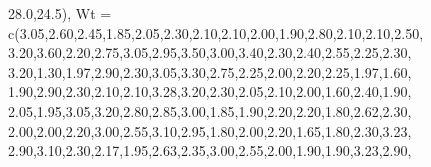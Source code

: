 \documentclass[
  letterpaper,
  DIV=11,
  numbers=noendperiod]{scrartcl}
\newenvironment{Shaded}{\begin{snugshade}}{\end{snugshade}}
\newcommand{\AttributeTok}[1]{\textcolor[rgb]{0.40,0.45,0.13}{#1}}
\newcommand{\FloatTok}[1]{\textcolor[rgb]{0.68,0.00,0.00}{#1}}
\newcommand{\FunctionTok}[1]{\textcolor[rgb]{0.28,0.35,0.67}{#1}}
\newcommand{\NormalTok}[1]{\textcolor[rgb]{0.00,0.23,0.31}{#1}}
\begin{document}
\begin{Shaded}
\begin{Highlighting}[]
        \FloatTok{28.0}\NormalTok{,}\FloatTok{24.5}\NormalTok{),}
  \AttributeTok{Wt =} \FunctionTok{c}\NormalTok{(}\FloatTok{3.05}\NormalTok{,}\FloatTok{2.60}\NormalTok{,}\FloatTok{2.45}\NormalTok{,}\FloatTok{1.85}\NormalTok{,}\FloatTok{2.05}\NormalTok{,}\FloatTok{2.30}\NormalTok{,}\FloatTok{2.10}\NormalTok{,}\FloatTok{2.10}\NormalTok{,}\FloatTok{2.00}\NormalTok{,}\FloatTok{1.90}\NormalTok{,}\FloatTok{2.80}\NormalTok{,}\FloatTok{2.10}\NormalTok{,}\FloatTok{2.10}\NormalTok{,}\FloatTok{2.50}\NormalTok{,}
         \FloatTok{3.20}\NormalTok{,}\FloatTok{3.60}\NormalTok{,}\FloatTok{2.20}\NormalTok{,}\FloatTok{2.75}\NormalTok{,}\FloatTok{3.05}\NormalTok{,}\FloatTok{2.95}\NormalTok{,}\FloatTok{3.50}\NormalTok{,}\FloatTok{3.00}\NormalTok{,}\FloatTok{3.40}\NormalTok{,}\FloatTok{2.30}\NormalTok{,}\FloatTok{2.40}\NormalTok{,}\FloatTok{2.55}\NormalTok{,}\FloatTok{2.25}\NormalTok{,}\FloatTok{2.30}\NormalTok{,}
         \FloatTok{3.20}\NormalTok{,}\FloatTok{1.30}\NormalTok{,}\FloatTok{1.97}\NormalTok{,}\FloatTok{2.90}\NormalTok{,}\FloatTok{2.30}\NormalTok{,}\FloatTok{3.05}\NormalTok{,}\FloatTok{3.30}\NormalTok{,}\FloatTok{2.75}\NormalTok{,}\FloatTok{2.25}\NormalTok{,}\FloatTok{2.00}\NormalTok{,}\FloatTok{2.20}\NormalTok{,}\FloatTok{2.25}\NormalTok{,}\FloatTok{1.97}\NormalTok{,}\FloatTok{1.60}\NormalTok{,}
         \FloatTok{1.90}\NormalTok{,}\FloatTok{2.90}\NormalTok{,}\FloatTok{2.30}\NormalTok{,}\FloatTok{2.10}\NormalTok{,}\FloatTok{2.10}\NormalTok{,}\FloatTok{3.28}\NormalTok{,}\FloatTok{3.20}\NormalTok{,}\FloatTok{2.30}\NormalTok{,}\FloatTok{2.05}\NormalTok{,}\FloatTok{2.10}\NormalTok{,}\FloatTok{2.00}\NormalTok{,}\FloatTok{1.60}\NormalTok{,}\FloatTok{2.40}\NormalTok{,}\FloatTok{1.90}\NormalTok{,}
         \FloatTok{2.05}\NormalTok{,}\FloatTok{1.95}\NormalTok{,}\FloatTok{3.05}\NormalTok{,}\FloatTok{3.20}\NormalTok{,}\FloatTok{2.80}\NormalTok{,}\FloatTok{2.85}\NormalTok{,}\FloatTok{3.00}\NormalTok{,}\FloatTok{1.85}\NormalTok{,}\FloatTok{1.90}\NormalTok{,}\FloatTok{2.20}\NormalTok{,}\FloatTok{2.20}\NormalTok{,}\FloatTok{1.80}\NormalTok{,}\FloatTok{2.62}\NormalTok{,}\FloatTok{2.30}\NormalTok{,}
         \FloatTok{2.00}\NormalTok{,}\FloatTok{2.00}\NormalTok{,}\FloatTok{2.20}\NormalTok{,}\FloatTok{3.00}\NormalTok{,}\FloatTok{2.55}\NormalTok{,}\FloatTok{3.10}\NormalTok{,}\FloatTok{2.95}\NormalTok{,}\FloatTok{1.80}\NormalTok{,}\FloatTok{2.00}\NormalTok{,}\FloatTok{2.20}\NormalTok{,}\FloatTok{1.65}\NormalTok{,}\FloatTok{1.80}\NormalTok{,}\FloatTok{2.30}\NormalTok{,}\FloatTok{3.23}\NormalTok{,}
         \FloatTok{2.90}\NormalTok{,}\FloatTok{3.10}\NormalTok{,}\FloatTok{2.30}\NormalTok{,}\FloatTok{2.17}\NormalTok{,}\FloatTok{1.95}\NormalTok{,}\FloatTok{2.63}\NormalTok{,}\FloatTok{2.35}\NormalTok{,}\FloatTok{3.00}\NormalTok{,}\FloatTok{2.55}\NormalTok{,}\FloatTok{2.00}\NormalTok{,}\FloatTok{1.90}\NormalTok{,}\FloatTok{1.90}\NormalTok{,}\FloatTok{3.23}\NormalTok{,}\FloatTok{2.90}\NormalTok{,}

\end{Highlighting}
\end{Shaded}
\end{document}
